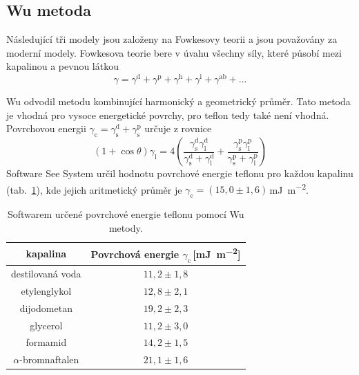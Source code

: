 \documentclass{protokol}
\begin{document}
\subsection{Wu metoda}
\par Následující tři modely jsou založeny na Fowkesovy teorii a jsou považovány 
za moderní modely. Fowkesova teorie bere v úvahu všechny síly, které působí 
mezi kapalinou a pevnou látkou 
\begin{equation}
\gamma = \gamma^\text{d} + \gamma^\text{p} +
\gamma^\text{h} + \gamma^\text{i} + \gamma^\text{ab} + ...
\end{equation}
\par Wu odvodil metodu kombinující harmonický a geometrický průměr. Tato metoda 
je vhodná pro vysoce energetické povrchy, pro teflon tedy také 
není vhodná. Povrchovou energii $\gamma_{\text{c}} = 
\gamma_{\text{s}}^{\text{d}} + \gamma_{\text{s}}^{\text{p}}$ určuje z rovnice
\begin{equation}
	\left(1+\cos\theta\right)\gamma_{\text{l}} = 
	4\left(\frac{\gamma_{\text{s}}^\text{d}\gamma_{\text{l}}^\text{d}}{\gamma_{\text{s}}^\text{d}
		+ \gamma_{\text{l}}^\text{d}} + 
	\frac{\gamma_{\text{s}}^\text{p}\gamma_{\text{l}}^\text{p}}{\gamma_{\text{s}}^\text{p}
		+ \gamma_{\text{l}}^\text{p}}\right)
\end{equation}
Software See System určil hodnotu povrchové energie teflonu pro každou 
kapalinu (tab.~\ref{table:Wu}), kde jejich aritmetický průměr je 
$\gamma_{\text{c}} = (15,0\pm1,6)$\,\si{\milli\joule\per\meter\squared}.

\begin{table}[h]
	\caption{Softwarem určené povrchové energie teflonu pomocí Wu metody.}
	\label{table:Wu}
	\begin{tabular}{|c|c|}\hline
		kapalina  & Povrchová energie 
		$\gamma_{\text{c}}$\,[\si{\milli\joule\per\meter\squared}] \\ \hline
		destilovaná voda & $11,2 \pm 1,8$     \\
		etylenglykol     & $12,8 \pm 2,1$     \\
		dijodometan      & $19,2 \pm 2,3$     \\
		glycerol         & $11,2 \pm 3,0$     \\
		formamid         & $14,2 \pm 1,5$     \\
		$\alpha$-bromnaftalen & $21,1 \pm 1,6$\\ \hline
	\end{tabular}
\end{table}
\end{document}
